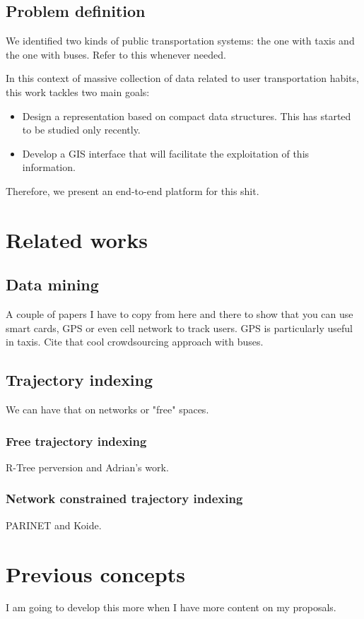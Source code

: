 \documentclass{UniVieCS_PhD} %
\begin{document}
	\subsection{Problem definition}
	\label{sec:pd}
	We identified two kinds of public transportation systems: the one with taxis and the one with buses. Refer to this whenever needed.
	
	In this context of massive collection of data related to user transportation habits, this work tackles two main goals:
	
	\begin{itemize}
	    \item Design a representation based on compact data structures. This has started to be studied only recently.
	    \item Develop a GIS interface that will facilitate the exploitation of this information.
	\end{itemize}
	
	Therefore, we present an end-to-end platform for this shit.
	
	\section{Related works}
	\subsection{Data mining}
	A couple of papers I have to copy from here and there to show that you can use smart cards, GPS or even cell network to track users. GPS is particularly useful in taxis. Cite that cool crowdsourcing approach with buses.
	
	\subsection{Trajectory indexing}
	We can have that on networks or "free" spaces.
	
	\subsubsection{Free trajectory indexing}
	R-Tree perversion and Adrian's work.
	
	\subsubsection{Network constrained trajectory indexing}
	PARINET and Koide.
	
	\section{Previous concepts}
	I am going to develop this more when I have more content on my proposals.
	
\end{document}
